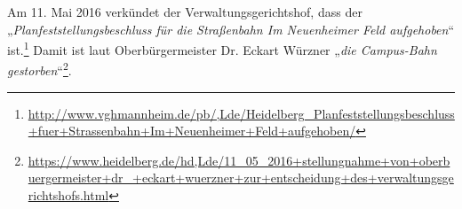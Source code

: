 Am 11. Mai 2016 verkündet der Verwaltungsgerichtshof, dass der „\textit{Planfeststellungsbeschluss für die Straßenbahn Im Neuenheimer Feld aufgehoben}“ ist.\footnote{\url{http://www.vghmannheim.de/pb/,Lde/Heidelberg_Planfeststellungsbeschluss+fuer+Strassenbahn+Im+Neuenheimer+Feld+aufgehoben/}} Damit ist laut Oberbürgermeister Dr. Eckart Würzner „\textit{die Campus-Bahn gestorben}“\footnote{\url{https://www.heidelberg.de/hd,Lde/11_05_2016+stellungnahme+von+oberbuergermeister+dr_+eckart+wuerzner+zur+entscheidung+des+verwaltungsgerichtshofs.html}}.
